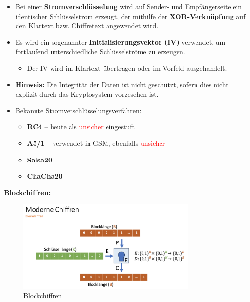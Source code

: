 \documentclass[a4paper,12pt]{article}
\begin{document}
\begin{itemize}
    \item Bei einer \textbf{Stromverschlüsselung} wird auf Sender- und Empfängerseite ein identischer Schlüsselstrom erzeugt, der mithilfe der \textbf{XOR-Verknüpfung} auf den Klartext bzw. Chiffretext angewendet wird.
    
    \item Es wird ein sogenannter \textbf{Initialisierungsvektor (IV)} verwendet, um fortlaufend unterschiedliche Schlüsselströme zu erzeugen.
    \begin{itemize}
        \item Der IV wird im Klartext übertragen oder im Vorfeld ausgehandelt.
    \end{itemize}
    
    \item \textbf{Hinweis:} Die Integrität der Daten ist nicht geschützt, sofern dies nicht explizit durch das Kryptosystem vorgesehen ist.
    
    \item Bekannte Stromverschlüsselungsverfahren:
    \begin{itemize}
        \item \textbf{RC4} – heute als \textcolor{red}{unsicher} eingestuft
        \item \textbf{A5/1} – verwendet in GSM, ebenfalls \textcolor{red}{unsicher}
        \item \textbf{Salsa20}
        \item \textbf{ChaCha20}
    \end{itemize}
\end{itemize}
\vspace{1em}
\noindent\textbf{Blockchiffren:}
\begin{figure}
    \centering
    \includegraphics[width=0.8\textwidth]{bilder/blockchiffren.png}
    \caption{Blockchiffren}
    \label{fig:blockchiffren}
\end{figure}
\end{document}
